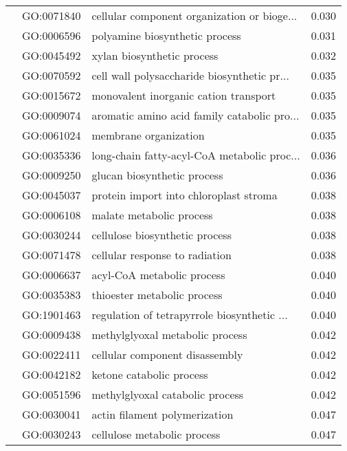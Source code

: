 \begin{longtable}{lllr}
   & GO:0071840 &  cellular component organization or bioge... &         0.030 \\
   & GO:0006596 &               polyamine biosynthetic process &         0.031 \\
   & GO:0045492 &                   xylan biosynthetic process &         0.032 \\
   & GO:0070592 &  cell wall polysaccharide biosynthetic pr... &         0.035 \\
   & GO:0015672 &        monovalent inorganic cation transport &         0.035 \\
   & GO:0009074 &  aromatic amino acid family catabolic pro... &         0.035 \\
   & GO:0061024 &                        membrane organization &         0.035 \\
   & GO:0035336 &  long-chain fatty-acyl-CoA metabolic proc... &         0.036 \\
   & GO:0009250 &                  glucan biosynthetic process &         0.036 \\
   & GO:0045037 &       protein import into chloroplast stroma &         0.038 \\
   & GO:0006108 &                     malate metabolic process &         0.038 \\
   & GO:0030244 &               cellulose biosynthetic process &         0.038 \\
   & GO:0071478 &               cellular response to radiation &         0.038 \\
   & GO:0006637 &                   acyl-CoA metabolic process &         0.040 \\
   & GO:0035383 &                  thioester metabolic process &         0.040 \\
   & GO:1901463 &  regulation of tetrapyrrole biosynthetic ... &         0.040 \\
   & GO:0009438 &              methylglyoxal metabolic process &         0.042 \\
   & GO:0022411 &               cellular component disassembly &         0.042 \\
   & GO:0042182 &                     ketone catabolic process &         0.042 \\
   & GO:0051596 &              methylglyoxal catabolic process &         0.042 \\
   & GO:0030041 &                actin filament polymerization &         0.047 \\
   & GO:0030243 &                  cellulose metabolic process &         0.047 \\

\end{longtable}
